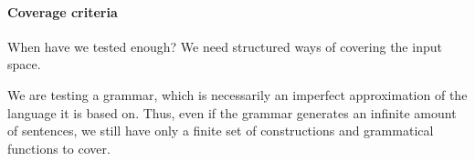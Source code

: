 \paragraph{Coverage criteria}

When have we tested enough? We need structured ways of covering the input
space.

We are testing a grammar, which is necessarily an imperfect
approximation of the language it is based on. Thus, even if the
grammar generates an infinite amount of sentences, we still have only
a finite set of constructions and grammatical functions to cover.






